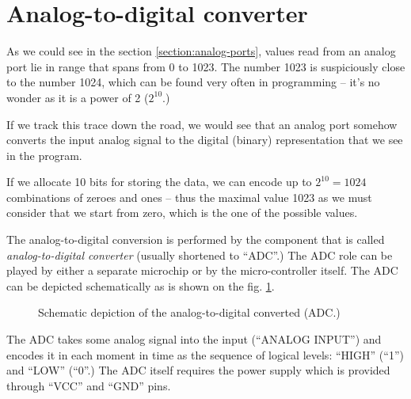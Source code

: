 \documentclass[../sparc.tex]{subfiles}
\begin{document}
\section{Analog-to-digital converter}

As we could see in the section \ref{section:analog-ports}, values read from an
analog port lie in range that spans from 0 to 1023.  The number 1023 is
suspiciously close to the number 1024, which can be found very often in
programming -- it's no wonder as it is a power of 2 ($2^{10}$.)

If we track this trace down the road, we would see that an analog port somehow
converts the input analog signal to the digital (binary) representation that we
see in the program.

If we allocate 10 bits for storing the data, we can encode up to $2^{10} = 1024$
combinations of zeroes and ones -- thus the maximal value 1023 as we must
consider that we start from zero, which is the one of the possible values.

The analog-to-digital conversion is performed by the component that is called
\emph{analog-to-digital converter} (usually shortened to ``ADC''.)  The ADC role
can be played by either a separate microchip or by the micro-controller itself.
The ADC can be depicted schematically as is shown on the
fig. \ref{fig:adc-schematics}.

\begin{figure}[ht]
  \centering
  \caption{Schematic depiction of the analog-to-digital converted (ADC.)}
  \label{fig:adc-schematics}
\end{figure}

The ADC takes some analog signal into the input (``ANALOG INPUT'') and encodes
it in each moment in time as the sequence of logical levels: ``HIGH'' (``1'')
and ``LOW'' (``0''.)  The ADC itself requires the power supply which is provided
through ``VCC'' and ``GND'' pins.
\end{document}
